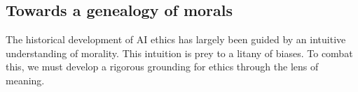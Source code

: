     


\subsection{Towards a genealogy of morals}
The historical development of AI ethics has largely been guided by an intuitive understanding of morality. This intuition is prey to a litany of biases. To combat this, we must develop a rigorous grounding for ethics through the lens of meaning.

